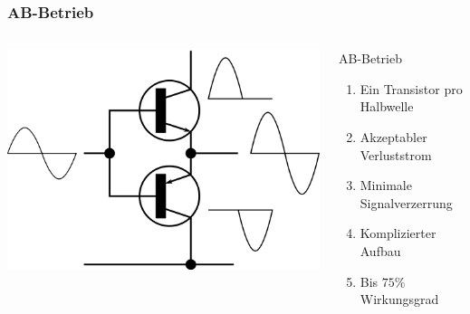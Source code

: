 \begin{frame}
  \frametitle{AB-Betrieb}
  \begin{columns}[c]
    \begin{center}
      \includegraphics[width=1\textwidth,height=.8\textheight,keepaspectratio]{a07/Electronic_Amplifier_Push-pull.png}\\
      {\tiny \hyperlink{refs}{\cite{wm}}}
    \end{center}
     \large
    \begin{block}{AB-Betrieb}
      \begin{enumerate} 
        \item Ein Transistor pro Halbwelle
        \item Akzeptabler Verluststrom
        \item Minimale Signalverzerrung
        \item Komplizierter Aufbau
        \item Bis $75\%$ Wirkungsgrad
      \end{enumerate}
    \end{block}
  \end{columns}
\end{frame}

